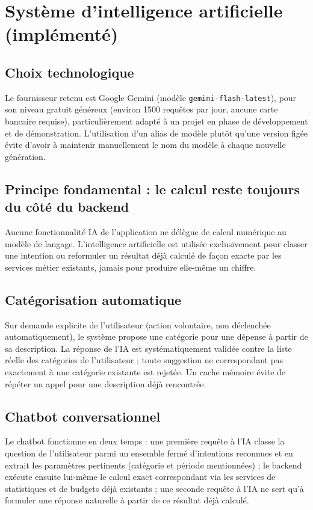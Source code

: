 \documentclass[11pt,a4paper]{article}
\begin{document}
\section{Système d'intelligence artificielle (implémenté)}

\subsection{Choix technologique}
Le fournisseur retenu est Google Gemini (modèle \texttt{gemini-flash-latest}), pour son niveau gratuit généreux (environ 1500 requêtes par jour, aucune carte bancaire requise), particulièrement adapté à un projet en phase de développement et de démonstration. L'utilisation d'un alias de modèle plutôt qu'une version figée évite d'avoir à maintenir manuellement le nom du modèle à chaque nouvelle génération.

\subsection{Principe fondamental : le calcul reste toujours du côté du backend}
Aucune fonctionnalité IA de l'application ne délègue de calcul numérique au modèle de langage. L'intelligence artificielle est utilisée exclusivement pour classer une intention ou reformuler un résultat déjà calculé de façon exacte par les services métier existants, jamais pour produire elle-même un chiffre.

\subsection{Catégorisation automatique}
Sur demande explicite de l'utilisateur (action volontaire, non déclenchée automatiquement), le système propose une catégorie pour une dépense à partir de sa description. La réponse de l'IA est systématiquement validée contre la liste réelle des catégories de l'utilisateur ; toute suggestion ne correspondant pas exactement à une catégorie existante est rejetée. Un cache mémoire évite de répéter un appel pour une description déjà rencontrée.

\subsection{Chatbot conversationnel}
Le chatbot fonctionne en deux temps : une première requête à l'IA classe la question de l'utilisateur parmi un ensemble fermé d'intentions reconnues et en extrait les paramètres pertinents (catégorie et période mentionnées) ; le backend exécute ensuite lui-même le calcul exact correspondant via les services de statistiques et de budgets déjà existants ; une seconde requête à l'IA ne sert qu'à formuler une réponse naturelle à partir de ce résultat déjà calculé.
\end{document}
